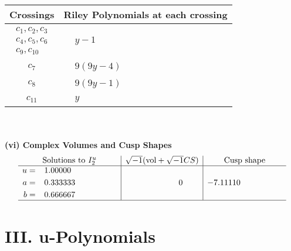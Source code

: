 \documentclass[1p]{elsarticle_modified}
\theoremstyle{definition}
\newcommand{\I}{\sqrt{-1}}
\begin{document}
\begin{tabular}{m{50pt}|m{274pt}}
Crossings & \hspace{64pt}Riley Polynomials at each crossing \\
\hline $$\begin{aligned}c_{1},c_{2},c_{3}\\c_{4},c_{5},c_{6}\\c_{9},c_{10}\end{aligned}$$&$\begin{aligned}
&y-1
\end{aligned}$\\
\hline $$\begin{aligned}c_{7}\end{aligned}$$&$\begin{aligned}
&9(9 y-4)
\end{aligned}$\\
\hline $$\begin{aligned}c_{8}\end{aligned}$$&$\begin{aligned}
&9(9 y-1)
\end{aligned}$\\
\hline $$\begin{aligned}c_{11}\end{aligned}$$&$\begin{aligned}
&y
\end{aligned}$\\
\hline
\end{tabular}\\~\\
\newpage\flushleft \textbf{(vi) Complex Volumes and Cusp Shapes}
$$\begin{array}{c|c|c}  
\text{Solutions to }I^u_{2}& \I (\text{vol} + \sqrt{-1}CS) & \text{Cusp shape}\\
 \hline 
\begin{aligned}
u &= \phantom{-}1.00000\phantom{ +0.000000I} \\
a &= \phantom{-}0.333333\phantom{ +0.000000I} \\
b &= \phantom{-}0.666667\phantom{ +0.000000I}\end{aligned}
 & \phantom{-0.000000 } 0 & -7.11110\phantom{ +0.000000I}\\
 \hline 
 \end{array}$$\newpage
\newpage\renewcommand{\arraystretch}{1}
\centering \section*{ III. u-Polynomials}
\end{document}
